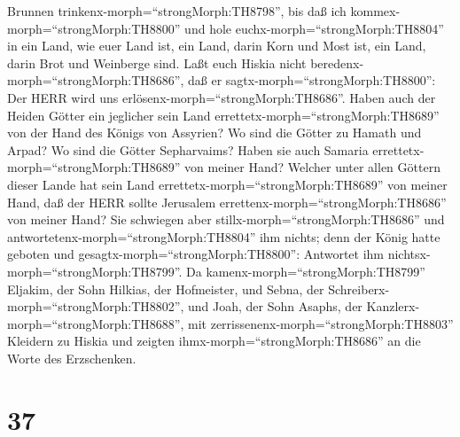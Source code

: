 Brunnen trinkenx-morph=``strongMorph:TH8798'',  bis daß ich
kommex-morph=``strongMorph:TH8800'' und hole
euchx-morph=``strongMorph:TH8804'' in ein Land, wie euer Land ist, ein
Land, darin Korn und Most ist, ein Land, darin Brot und Weinberge sind.
 Laßt euch Hiskia nicht
beredenx-morph=``strongMorph:TH8686'', daß er
sagtx-morph=``strongMorph:TH8800'': Der HERR wird uns
erlösenx-morph=``strongMorph:TH8686''. Haben auch der Heiden Götter ein
jeglicher sein Land errettetx-morph=``strongMorph:TH8689'' von der Hand
des Königs von Assyrien?  Wo sind die Götter zu Hamath und
Arpad? Wo sind die Götter Sepharvaims? Haben sie auch Samaria
errettetx-morph=``strongMorph:TH8689'' von meiner Hand? 
Welcher unter allen Göttern dieser Lande hat sein Land
errettetx-morph=``strongMorph:TH8689'' von meiner Hand, daß der HERR
sollte Jerusalem errettenx-morph=``strongMorph:TH8686'' von meiner Hand?
 Sie schwiegen aber stillx-morph=``strongMorph:TH8686'' und
antwortetenx-morph=``strongMorph:TH8804'' ihm nichts; denn der König
hatte geboten und gesagtx-morph=``strongMorph:TH8800'': Antwortet ihm
nichtsx-morph=``strongMorph:TH8799''.  Da
kamenx-morph=``strongMorph:TH8799'' Eljakim, der Sohn Hilkias, der
Hofmeister, und Sebna, der Schreiberx-morph=``strongMorph:TH8802'', und
Joah, der Sohn Asaphs, der Kanzlerx-morph=``strongMorph:TH8688'', mit
zerrissenenx-morph=``strongMorph:TH8803'' Kleidern zu Hiskia und zeigten
ihmx-morph=``strongMorph:TH8686'' an die Worte des Erzschenken.

\hypertarget{section-36}{%
\section{37}\label{section-36}}

